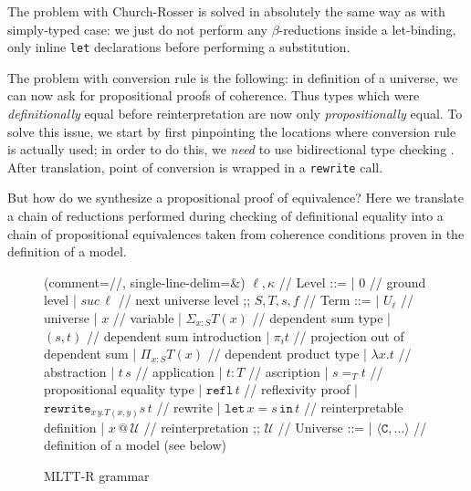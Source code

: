 \documentclass[acmsmall, review, screen, authorversion]{acmart}
\begin{document}
The problem with Church-Rosser is solved in absolutely the same way
as with simply-typed case: we just do not perform any
$\beta$-reductions inside a let-binding, only inline \texttt{let}
declarations before performing a substitution.

The problem with conversion rule is the following: in definition of a
universe, we can now ask for propositional proofs of coherence. Thus
types which were \textit{definitionally} equal before
reinterpretation are now only \textit{propositionally} equal. To
solve this issue, we start by first pinpointing the locations where
conversion rule is actually used; in order to do this, we
\textit{need} to use bidirectional type checking
\cite{bidirectional}. After translation, point of conversion is
wrapped in a \texttt{rewrite} call.

But how do we synthesize a propositional proof of equivalence? Here
we translate a chain of reductions performed during checking of
definitional equality into a chain of propositional equivalences
taken from coherence conditions proven in the definition of a model.

\begin{figure}
    \centering
\begin{bnf}(comment={//}, single-line-delim={\&})
    $\ell,\kappa$ // \textsf{Level} ::=
    | $0$ // ground level
    | $suc\,\ell$ // next universe level
    ;;
    $S,T,s,f$ // \textsf{Term} ::=
    | $U_\ell$ // universe
    | $x$ // variable
    | $\Sigma_{x:S}T(x)$ // dependent sum type
    | $(s, t)$ // dependent sum introduction
    | $\pi_i t$ // projection out of dependent sum
    | $\Pi_{x:S}T(x)$ // dependent product type
    | $\lambda x.t$ // abstraction
    | $t\,s$ // application
    | $t:T$ // ascription
    | $s=_T t$ // propositional equality type
    | $\mathtt{refl}\,t$ // reflexivity proof
    | $\mathtt{rewrite}_{x\,y.T(x,y)}s\,t$ // rewrite
    | $\mathtt{let}\,x=s\,\mathtt{in}\,t$
        // reinterpretable definition
    | $x\,@\,\mathcal{U}$ // reinterpretation
    ;;
    $\mathcal{U}$ // \textsf{Universe} ::=
    | $\langle \mathtt{C},\ldots \rangle$
        // definition of a model (see below)
\end{bnf}
    \caption{MLTT-R grammar}
\end{figure}
\end{document}
